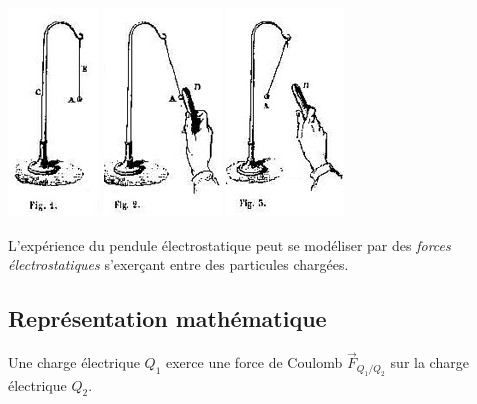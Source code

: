 \begin{center}
\includegraphics[scale=0.9]{./forces/Mascart01}
\hspace{0.3cm}
\includegraphics[scale=0.9]{./forces/Mascart02}
\hspace{0.3cm}
\includegraphics[scale=0.9]{./forces/Mascart03}
\end{center}

L'expérience du pendule électrostatique peut se modéliser par des {\it forces électrostatiques} s'exerçant entre des particules chargées.

\subsection{Représentation mathématique}
Une charge électrique $Q_1$ exerce une force de Coulomb $\overrightarrow{F}_{Q_1/Q_2}$ sur la charge électrique $Q_2$.

